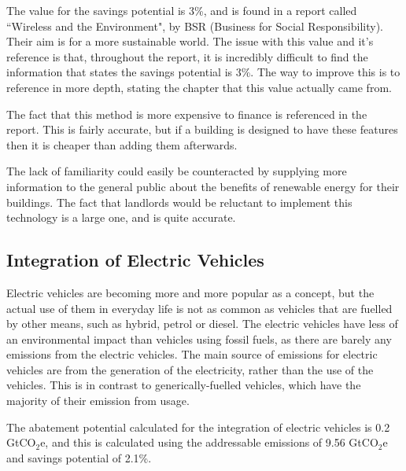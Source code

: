 
The value for the savings potential is 3\%, and is found in a report called ``Wireless and the Environment", by BSR (Business for Social Responsibility). Their aim is for a more sustainable world. The issue with this value and it's reference is that, throughout the report, it is incredibly difficult to find the information that states the savings potential is 3\%. The way to improve this is to reference in more depth, stating the chapter that this value actually came from.

The fact that this method is more expensive to finance is referenced in the report. This is fairly accurate, but if a building is designed to have these features then it is cheaper than adding them afterwards. 

The lack of familiarity could easily be counteracted by supplying more information to the general public about the benefits of renewable energy for their buildings. 
The fact that landlords would be reluctant to implement this technology is a large one, and is quite accurate. 





\subsection{Integration of Electric Vehicles}

Electric vehicles are becoming more and more popular as a concept, but the actual use of them in everyday life is not as common as vehicles that are fuelled by other means, such as hybrid, petrol or diesel. The electric vehicles have less of an environmental impact than vehicles using fossil fuels, as there are barely any emissions from the electric vehicles. The main source of emissions for electric vehicles are from the generation of the electricity, rather than the use of the vehicles. This is in contrast to generically-fuelled vehicles, which have the majority of their emission from usage. 


The abatement potential calculated for the integration of electric vehicles is 0.2 GtCO$_2$e, and this is calculated using the addressable emissions of 9.56 GtCO$_2$e and savings potential of 2.1\%.

